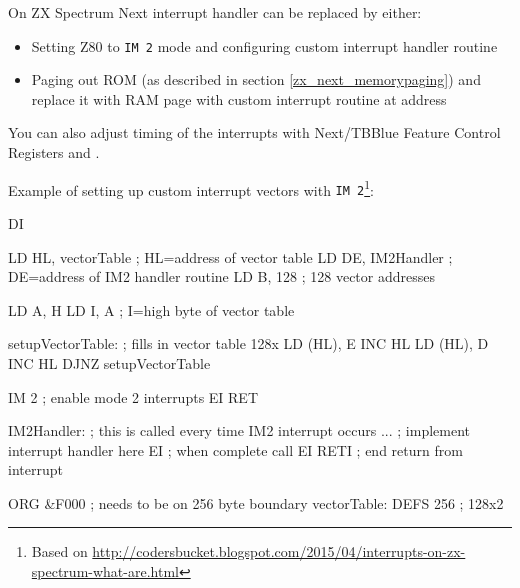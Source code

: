 On ZX Spectrum Next interrupt handler can be replaced by either:

\begin{itemize}
	\item Setting Z80 to {\tt IM 2} mode and configuring custom interrupt handler routine
	
	\item Paging out ROM (as described in section \ref{zx_next_memorypaging}) and replace it with RAM page with custom interrupt routine at address 
\end{itemize}

You can also adjust timing of the interrupts with Next/TBBlue Feature Control Registers  and .

\pagebreak
Example of setting up custom interrupt vectors with {\tt IM 2}\footnote{Based on \url{http://codersbucket.blogspot.com/2015/04/interrupts-on-zx-spectrum-what-are.html}}:

\begin{tcblisting}{}
	DI
	
	LD HL, vectorTable    ; HL=address of vector table
	LD DE, IM2Handler     ; DE=address of IM2 handler routine
	LD B, 128             ; 128 vector addresses

	LD A, H
	LD I, A               ; I=high byte of vector table

setupVectorTable:         ; fills in vector table 128x
	LD (HL), E
	INC HL
	LD (HL), D
	INC HL
	DJNZ setupVectorTable 

	IM 2                  ; enable mode 2 interrupts
	EI
	RET

IM2Handler:               ; this is called every time IM2 interrupt occurs
	...                   ; implement interrupt handler here
	EI                    ; when complete call EI
	RETI                  ; end return from interrupt

	ORG &F000             ; needs to be on 256 byte boundary
vectorTable:
	DEFS 256              ; 128x2
\end{tcblisting}



\pagebreak
